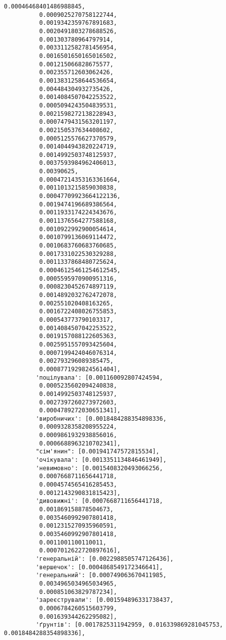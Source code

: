 \documentclass[11pt]{article}
\begin{document}
\begin{Verbatim}[commandchars=\\\{\}]
          0.00046468401486988845,
          0.0009025270758122744,
          0.0019342359767891683,
          0.0020491803278688526,
          0.001303780964797914,
          0.0033112582781456954,
          0.0016501650165016502,
          0.001215066828675577,
          0.002355712603062426,
          0.0013831258644536654,
          0.004484304932735426,
          0.0014084507042253522,
          0.0005094243504839531,
          0.0021598272138228943,
          0.0007479431563201197,
          0.002150537634408602,
          0.0005125576627370579,
          0.0014044943820224719,
          0.0014992503748125937,
          0.0037593984962406013,
          0.00390625,
          0.00047214353163361664,
          0.0011013215859030838,
          0.00047709923664122136,
          0.0019474196689386564,
          0.0011933174224343676,
          0.0011376564277588168,
          0.0010922992900054614,
          0.0010799136069114472,
          0.0010683760683760685,
          0.0017331022530329288,
          0.0011337868480725624,
          0.00046125461254612545,
          0.0005595970900951316,
          0.0008230452674897119,
          0.0014892032762472078,
          0.002551020408163265,
          0.0016722408026755853,
          0.000543773790103317,
          0.0014084507042253522,
          0.0019157088122605363,
          0.0025951557093425604,
          0.0007199424046076314,
          0.002793296089385475,
          0.0008771929824561404],
         'поцілувала': [0.001160092807424594,
          0.0005235602094240838,
          0.0014992503748125937,
          0.0027397260273972603,
          0.0004789272030651341],
         'виробничих': [0.0018484288354898336,
          0.0009328358208955224,
          0.0009861932938856016,
          0.0006688963210702341],
         "сім'янин": [0.001941747572815534],
         'очікувала': [0.0013351134846461949],
         'невимовно': [0.0015408320493066256,
          0.0007668711656441718,
          0.0004574565416285453,
          0.0012143290831815423],
         'дивовижні': [0.0007668711656441718,
          0.001869158878504673,
          0.0035460992907801418,
          0.0012315270935960591,
          0.0035460992907801418,
          0.0011001100110011,
          0.0007012622720897616],
         'генеральній': [0.0022988505747126436],
         'вершечок': [0.0004868549172346641],
         'генеральний': [0.000749063670411985,
          0.0034965034965034965,
          0.000851063829787234],
         'зареєстрували': [0.001594896331738437,
          0.0006784260515603799,
          0.001639344262295082],
         'ґрунтів': [0.0017825311942959, 0.016339869281045753, 0.0018484288354898336],

\end{Verbatim}
\end{document}
